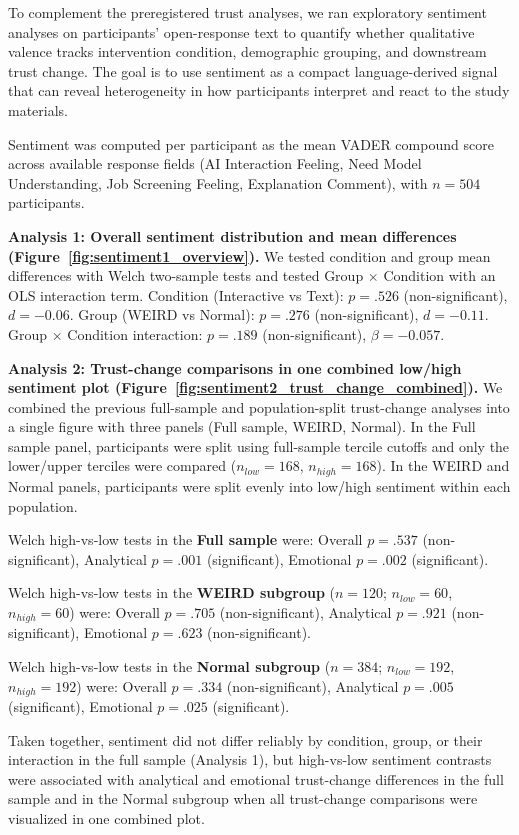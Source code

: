 To complement the preregistered trust analyses, we ran exploratory sentiment analyses on participants' open-response text to quantify whether qualitative valence tracks intervention condition, demographic grouping, and downstream trust change. The goal is to use sentiment as a compact language-derived signal that can reveal heterogeneity in how participants interpret and react to the study materials.

Sentiment was computed per participant as the mean VADER compound score across available response fields (AI Interaction Feeling, Need Model Understanding, Job Screening Feeling, Explanation Comment), with $n=504$ participants.

\textbf{Analysis 1: Overall sentiment distribution and mean differences (Figure~\ref{fig:sentiment1_overview}).} We tested condition and group mean differences with Welch two-sample tests and tested Group $\times$ Condition with an OLS interaction term. Condition (Interactive vs Text): $p = .526$ (non-significant), $d = -0.06$. Group (WEIRD vs Normal): $p = .276$ (non-significant), $d = -0.11$. Group $\times$ Condition interaction: $p = .189$ (non-significant), $\beta = -0.057$.

\textbf{Analysis 2: Trust-change comparisons in one combined low/high sentiment plot (Figure~\ref{fig:sentiment2_trust_change_combined}).} We combined the previous full-sample and population-split trust-change analyses into a single figure with three panels (Full sample, WEIRD, Normal). In the Full sample panel, participants were split using full-sample tercile cutoffs and only the lower/upper terciles were compared ($n_{low}=168$, $n_{high}=168$). In the WEIRD and Normal panels, participants were split evenly into low/high sentiment within each population.

Welch high-vs-low tests in the \textbf{Full sample} were: Overall $p = .537$ (non-significant), Analytical $p = .001$ (significant), Emotional $p = .002$ (significant).

Welch high-vs-low tests in the \textbf{WEIRD subgroup} ($n=120$; $n_{low}=60$, $n_{high}=60$) were: Overall $p = .705$ (non-significant), Analytical $p = .921$ (non-significant), Emotional $p = .623$ (non-significant).

Welch high-vs-low tests in the \textbf{Normal subgroup} ($n=384$; $n_{low}=192$, $n_{high}=192$) were: Overall $p = .334$ (non-significant), Analytical $p = .005$ (significant), Emotional $p = .025$ (significant).

Taken together, sentiment did not differ reliably by condition, group, or their interaction in the full sample (Analysis 1), but high-vs-low sentiment contrasts were associated with analytical and emotional trust-change differences in the full sample and in the Normal subgroup when all trust-change comparisons were visualized in one combined plot.

